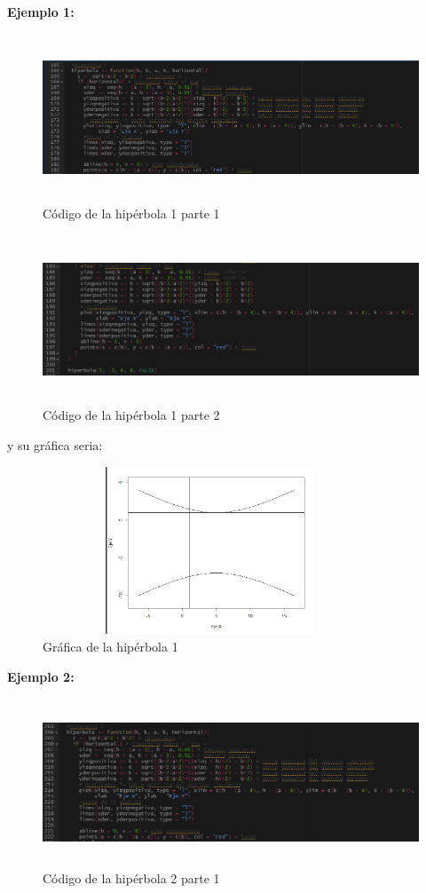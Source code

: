 \documentclass{article}
\begin{document}
\newpage
\textbf{Ejemplo 1:}

\begin{figure}[h]
    \centering
    \includegraphics[width=12cm, height=5cm]{Codigohipe1}
    \caption{Código de la hipérbola 1 parte 1}
    \label{fig:mesh17}
\end{figure}
\begin{figure}[h]
    \centering
    \includegraphics[width=12cm, height=5cm]{Codigohipe2}
    \caption{Código de la hipérbola 1 parte 2}
    \label{fig:mesh18}
\end{figure}
\newpage
y su gráfica seria:
\begin{figure}[ht]
    \centering
    \includegraphics[width=10cm, height=5cm]{Grafica9}
    \caption{Gráfica de la hipérbola 1}
    \label{fig:mesh19}
\end{figure}

\textbf{Ejemplo 2:}

\begin{figure}[h]
    \centering
    \includegraphics[width=12cm, height=5cm]{Codigohipe3}
    \caption{Código de la hipérbola 2 parte 1}
    \label{fig:mesh20}
\end{figure}
\end{document}
